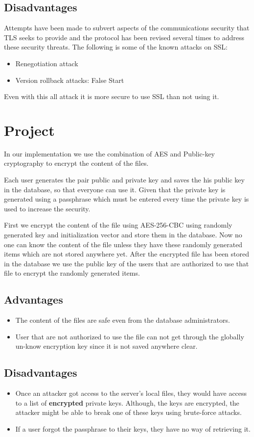 \subsection{Disadvantages}
Attempts have been made to subvert aspects of the communications security that TLS seeks to provide and the protocol has been revised several times to address these security threats. The following is some of the known attacks on SSL:
\begin{itemize}
	\item Renegotiation attack
	\item Version rollback attacks: False Start
\end{itemize}
Even with this all attack it is more secure to use SSL than not using it.

\section{Project}
\par In our implementation we use the combination of AES and Public-key cryptography to encrypt the content of the files.
\par Each user generates the pair public and private key and saves the his public key in the database, so that everyone can use it. Given that the private key is generated using a passphrase which must be entered every time the private key is used to increase the security.
\par First we encrypt the content of the file using AES-256-CBC using randomly generated key and initialization vector and store them in the database. Now no one can know the content of the file unless they have these randomly generated items which are not stored anywhere yet. After the encrypted file has been stored in the database we use the public key of the users that are authorized to use that file to encrypt the randomly generated items.
\subsection{Advantages}
\begin{itemize}
	\item The content of the files are safe even from the database administrators.
	\item User that are not authorized to use the file can not get through the globally un-know encryption key since it is not saved anywhere clear.
\end{itemize}
\subsection{Disadvantages}
\begin{itemize}
	\item Once an attacker got access to the server's local files, they would have access to a list of \textbf{encrypted} private keys. Although, the keys are encrypted, the attacker might be able to break one of these keys using brute-force attacks.
	\item If a user forgot the passphrase to their keys, they have no way of retrieving it.
\end{itemize}